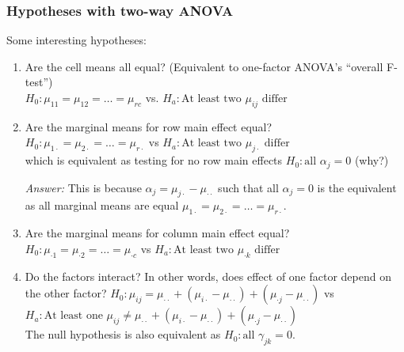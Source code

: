 \subsubsection*{Hypotheses with two-way ANOVA}
Some interesting hypotheses:
\begin{enumerate}
	\item Are the cell means all equal? (Equivalent to one-factor ANOVA's ``overall F-test'')\\
	$H_0: \mu_{11} = \mu_{12} = \dots = \mu_{rc}$ vs. $H_a: \mbox{At least two } \mu_{ij} \mbox{ differ}$
	\item Are the marginal means for row main effect equal?\\
	$H_0: \mu_{1\cdot} = \mu_{2\cdot} = \dots = \mu_{r\cdot}$ vs $H_a: \mbox{At least two } \mu_{j\cdot} \mbox{ differ}$\\
	which is equivalent as testing for no row main effects $H_0: \mbox{all } \alpha_j = 0$ (why?)\\
	\begin{pf}
		{\it Answer: }
		This is because $\alpha_j = \mu_{j \cdot} - \mu_{\cdot \cdot}$ such that all $\alpha_j = 0$ is the equivalent as all marginal means are equal $\mu_{1\cdot} = \mu_{2\cdot} = \dots = \mu_{r\cdot}$.
	\end{pf}
	\item Are the marginal means for column main effect equal?\\
	$H_0: \mu_{\cdot 1} = \mu_{\cdot 2} = \dots = \mu_{\cdot c}$ vs $H_a: \mbox{At least two } \mu_{\cdot k} \mbox{ differ}$\\	
	\item Do the factors interact? In other words, does effect of one factor depend on the other factor?
	$H_0: \mu_{ij} = \mu_{\cdot \cdot} + (\mu_{i \cdot} - \mu_{\cdot \cdot}) + (\mu_{\cdot j} - \mu_{\cdot \cdot})$ vs $H_a: \mbox{At least one } \mu_{ij} \neq \mu_{\cdot \cdot} + (\mu_{i \cdot} - \mu_{\cdot \cdot}) + (\mu_{\cdot j} - \mu_{\cdot \cdot})$\\
	The null hypothesis is also equivalent as $H_0: \mbox{all } \gamma_{jk} = 0$.
\end{enumerate}

